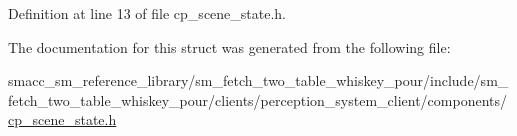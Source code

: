 Definition at line 13 of file cp\+\_\+scene\+\_\+state.\+h.



The documentation for this struct was generated from the following file\+:\begin{DoxyCompactItemize}
\item 
smacc\+\_\+sm\+\_\+reference\+\_\+library/sm\+\_\+fetch\+\_\+two\+\_\+table\+\_\+whiskey\+\_\+pour/include/sm\+\_\+fetch\+\_\+two\+\_\+table\+\_\+whiskey\+\_\+pour/clients/perception\+\_\+system\+\_\+client/components/\hyperlink{sm__fetch__two__table__whiskey__pour_2include_2sm__fetch__two__table__whiskey__pour_2clients_2pe1d884b2ae39657d62d2e1b48dc324a87}{cp\+\_\+scene\+\_\+state.\+h}\end{DoxyCompactItemize}
